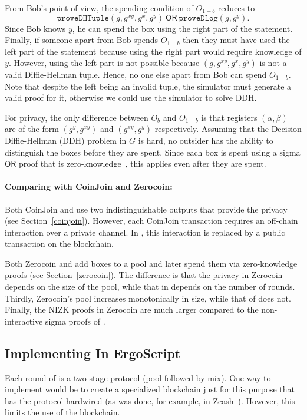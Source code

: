 \documentclass[runningheads]{llncs}
\newcommand{\langname}{ErgoScript\xspace}
\newcommand{\zerocoin}{Zerocoin\xspace}
\newcommand{\ornode}{\ensuremath{\mathsf{OR}}}
\begin{document}
From Bob's point of view, the spending condition of $O_{1-b}$ reduces to 
$$\texttt{proveDHTuple}(g, g^{xy}, g^x, g^{y}) ~\ornode~ \texttt{proveDlog}(g, g^{y}).$$
Since Bob knows $y$, he can spend the box using the right part of the statement. Finally, if someone apart from Bob spends $O_{1-b}$ then they must have used the left part of the statement because using the right part would require knowledge of $y$. However, using the left part is not possible because $(g, g^{xy}, g^x, g^{y})$ is not a valid Diffie-Hellman tuple. Hence, no one else apart from Bob can spend $O_{1-b}$. Note that despite the left being an invalid tuple, the simulator must generate a valid proof for it, otherwise we could use the simulator to solve DDH.

For privacy, the only difference between $O_b$ and $O_{1-b}$ is that registers $({\alpha},{\beta})$ are of the form $(g^y, g^{xy})$ and $(g^{xy}, g^y)$ respectively. Assuming that the Decision Diffie-Hellman (DDH) problem in $G$ is hard, no outsider has the ability to distinguish the boxes before they are spent. Since each box is spent using a sigma $\ornode$ proof that is zero-knowledge~\cite{Dam10}, this applies even after they are spent. 

\paragraph{Comparing with CoinJoin and \zerocoin:} Both CoinJoin and \algname use two indistinguishable outputs that provide the privacy (see Section~\ref{coinjoin}). However, each CoinJoin transaction requires an off-chain interaction over a private channel. In \algname, this interaction is replaced by a public transaction on the blockchain. 


Both \zerocoin and \algname add boxes to a pool and later spend them via zero-knowledge proofs (see Section~\ref{zerocoin}). 
The difference is that the privacy in \zerocoin depends on the size of the pool, while that in \algname depends on the number of rounds. Thirdly, \zerocoin's pool increases monotonically in size, while that of \algname does not. Finally, the NIZK proofs in \zerocoin are much larger compared to the non-interactive sigma proofs of \algname. 

\subsection{Implementing \algname In \langname}
\label{impl}
Each round of \algname is a two-stage protocol (pool followed by mix). One way to implement \algname would be to create a specialized blockchain just for this purpose that has the protocol hardwired (as was done, for example, in Zcash~\cite{zcash}). However, this limits the use of the blockchain. 
\end{document}

